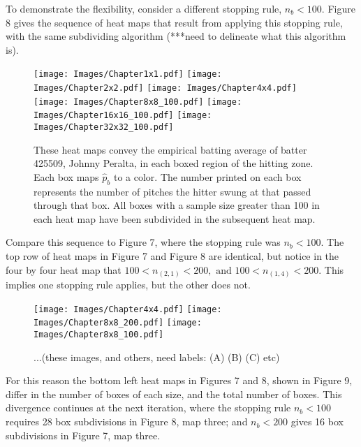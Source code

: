 To demonstrate the flexibility, consider a different stopping rule, $n_{b} < 100$. Figure 8 gives the sequence of heat maps that result from applying this stopping rule, with the same subdividing algorithm (***need to delineate what this algorithm is). 
        \begin{figure}[H]
      	\centering
      	\texttt{[image: Images/Chapter1x1.pdf]}
      	\texttt{[image: Images/Chapter2x2.pdf]}
      	\texttt{[image: Images/Chapter4x4.pdf]}
      	\texttt{[image: Images/Chapter8x8\_100.pdf]}
      	\texttt{[image: Images/Chapter16x16\_100.pdf]}
      	\texttt{[image: Images/Chapter32x32\_100.pdf]}
      	\caption{These heat maps convey the empirical batting average of batter 425509, Johnny Peralta, in each boxed region of the hitting zone. Each box maps $\hat{p}_{b}$ to a color. The number printed on each box represents the number of pitches the hitter swung at that passed through that box. All boxes with a sample size greater than 100 in each heat map have been subdivided in the subsequent heat map.}
\end{figure} 	
Compare this sequence to Figure 7, where the stopping rule was $n_{b} < 100$. The top row of heat maps in Figure 7 and Figure 8 are identical, but notice in the four by four heat map that $100 < n_{(2,1)} < 200, \text{ and } 100 < n_{(1,4)} < 200$. This implies one stopping rule applies, but the other does not.
        \begin{figure}[H]
      	\centering      
      	\texttt{[image: Images/Chapter4x4.pdf]}
      	\texttt{[image: Images/Chapter8x8\_200.pdf]}
      	\texttt{[image: Images/Chapter8x8\_100.pdf]}
      	\caption{...(these images, and others, need labels: (A) (B) (C) etc)}
\end{figure} 
For this reason the bottom left heat maps in Figures 7 and 8, shown in Figure 9, differ in the number of boxes of each size, and the total number of boxes. This divergence continues at the next iteration, where the stopping rule $n_{b} < 100$ requires 28 box subdivisions in Figure 8, map three; and $n_{b} < 200$ gives 16 box subdivisions in Figure 7, map three.




% 
% 
% 
% 